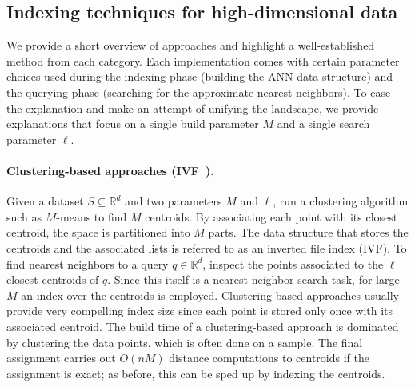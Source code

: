 \documentclass[11pt]{article}
\begin{document}
\subsection{Indexing techniques for high-dimensional data}

We provide a
short overview of approaches and highlight a well-established method from each category.
Each implementation comes with certain parameter choices used during the indexing phase (building the ANN data structure) and the querying phase (searching for the approximate nearest neighbors).
To ease the explanation and make an attempt of unifying the landscape, we provide explanations that focus on a single build parameter $M$ and a single search parameter $\ell$.

\paragraph{Clustering-based approaches
	(IVF~\cite{DBLP:journals/tbd/JohnsonDJ21}).} Given a dataset $S\subseteq
	\mathbb{R}^d$ and two parameters $M$ and $\ell$, run a clustering algorithm
such as $M$-means to find $M$ centroids. By associating each point with its
closest centroid, the space is partitioned into $M$ parts. The data
structure that stores the centroids and the associated lists is referred to
as an inverted file index (IVF). To find nearest neighbors to a query $q
	\in \mathbb{R}^d$, inspect the points associated to the $\ell$ closest
centroids of $q$. Since this itself is a nearest neighbor search task, for large $M$ an index over the centroids is employed.
Clustering-based approaches usually provide very compelling index size since each point is stored only once with its associated centroid.
The build time of a clustering-based approach is dominated by clustering the data points, which is often done on a sample.
The final assignment carries out $O(nM)$ distance computations to centroids if the assignment is exact; as before, this can be sped up by indexing the centroids.
\end{document}
